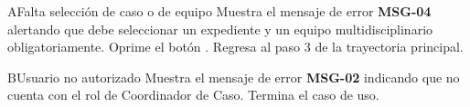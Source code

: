 \begin{UCtrayectoriaA}{A}{Falta selección de caso o de equipo}
	\UCpaso Muestra el mensaje de error {\bf MSG-04} alertando que debe seleccionar un expediente y un equipo multidisciplinario obligatoriamente.
	\UCpaso[\UCactor] Oprime el botón .
	\UCpaso Regresa al paso 3 de la trayectoria principal.
\end{UCtrayectoriaA}

\begin{UCtrayectoriaA}{B}{Usuario no autorizado}
	\UCpaso Muestra el mensaje de error {\bf MSG-02} indicando que no cuenta con el rol de Coordinador de Caso.
	\UCpaso Termina el caso de uso.
\end{UCtrayectoriaA}

